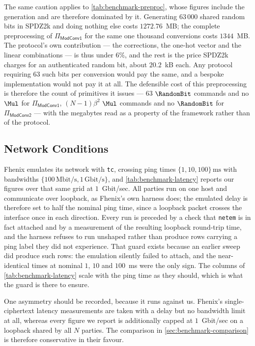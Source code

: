 The same caution applies to \cref{tab:benchmark-preproc}, whose figures include the generation and are therefore dominated by it.
Generating $63\,000$ shared random bits in SPDZ2k and doing nothing else costs $1272.76$~MB; the complete preprocessing of $\Pi_\mathsf{ModConv1}$ for the same one thousand conversions costs $1344$~MB.
The protocol's own contribution --- the corrections, the one-hot vector and the linear combinations --- is thus under $6\%$, and the rest is the price SPDZ2k charges for an authenticated random bit, about $20.2$~kB each.
Any protocol requiring $63$ such bits per conversion would pay the same, and a bespoke implementation would not pay it at all.
The defensible cost of this preprocessing is therefore the count of primitives it issues --- $63$ $\RandomBit$ commands and no $\Mul$ for $\Pi_\mathsf{ModConv1}$, $(N-1)\beta^2$ $\Mul$ commands and no $\RandomBit$ for $\Pi_\mathsf{ModConv2}$ --- with the megabytes read as a property of the framework rather than of the protocol.

\subsection{Network Conditions}
\label{sec:benchmark-network}

Fhenix emulates its network with \texttt{tc}, crossing ping times $\{1, 10, 100\}\,\mathrm{ms}$ with bandwidths $\{100\,\mathrm{Mbit/s}, 1\,\mathrm{Gbit/s}\}$, and \cref{tab:benchmark-latency} reports our figures over that same grid at $1$~Gbit/sec.
All parties run on one host and communicate over loopback, as Fhenix's own harness does; the emulated delay is therefore set to half the nominal ping time, since a loopback packet crosses the interface once in each direction.
Every run is preceded by a check that \texttt{netem} is in fact attached and by a measurement of the resulting loopback round-trip time, and the harness refuses to run unshaped rather than produce rows carrying a ping label they did not experience.
That guard exists because an earlier sweep did produce such rows: the emulation silently failed to attach, and the near-identical times at nominal $1$, $10$ and $100$~ms were the only sign.
The columns of \cref{tab:benchmark-latency} scale with the ping time as they should, which is what the guard is there to ensure.

One asymmetry should be recorded, because it runs against us.
Fhenix's single-ciphertext latency measurements are taken with a delay but no bandwidth limit at all, whereas every figure we report is additionally capped at $1$~Gbit/sec on a loopback shared by all $N$ parties.
The comparison in \cref{sec:benchmark-comparison} is therefore conservative in their favour.

